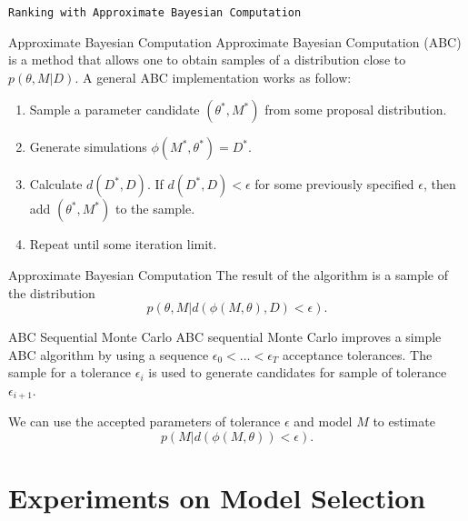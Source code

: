 \documentclass{beamer}
\begin{document}
\begin{frame}{}
\begin{center}
    \texttt{Ranking with Approximate Bayesian Computation}
\end{center}
\end{frame}


\begin{frame}{Approximate Bayesian Computation}
Approximate Bayesian Computation (ABC) is a method that allows one to
obtain samples of a distribution close to $p (\theta, M | D)$. \pause
A general ABC implementation works as follow:

\begin{enumerate}
    \pause
    \item{Sample a parameter candidate $(\theta^*, M^*)$ from some 
        proposal distribution.}
    \pause
    \item{Generate simulations $\phi (M^*, \theta^*) = D^*$.}
    \pause
    \item{Calculate $d (D^*, D).$ If $d (D^*, D) < \epsilon$ for some 
        previously specified $\epsilon$, then add $(\theta^*, M^*)$ to 
        the sample.}
    \pause
    \item{Repeat until some iteration limit.}
\end{enumerate}
\end{frame}


\begin{frame}{Approximate Bayesian Computation}
The result of the algorithm is a sample of the distribution 
\begin{equation*}
p (\theta, M| d (\phi (M, \theta), D) < \epsilon).
\end{equation*}

\end{frame}

\begin{frame}{ABC Sequential Monte Carlo}
ABC sequential Monte Carlo improves a simple ABC algorithm by using a 
sequence $\epsilon_0 < \ldots < \epsilon_T$ acceptance tolerances. 
\pause The sample for a tolerance $\epsilon_i$ is used to generate 
candidates for sample of tolerance $\epsilon_{i + 1}$.

\pause
We can use the accepted parameters of tolerance $\epsilon$ and model $M$
to estimate 
\begin{equation*}
    p (M | d (\phi (M, \theta)) < \epsilon).
\end{equation*}
\end{frame}

\section{Experiments on Model Selection}
\end{document}
